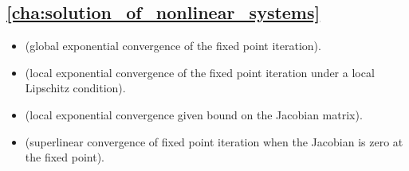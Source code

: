 \subsection*{\cref{cha:solution_of_nonlinear_systems}}%

\begin{itemize}
    \item {} (global exponential convergence of the fixed point iteration).
    \item {} (local exponential convergence of the fixed point iteration under a local Lipschitz condition).
    \item {}  (local exponential convergence given bound on the Jacobian matrix).
    \item {} (superlinear convergence of fixed point iteration when the Jacobian is zero at the fixed point).
\end{itemize}
